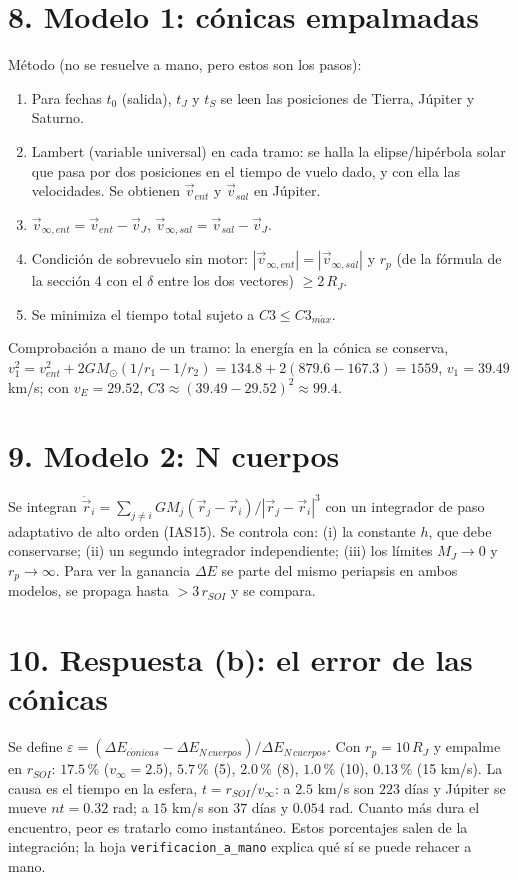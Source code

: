 \documentclass[11pt,letterpaper]{article}
\newcommand{\vinf}{v_\infty}\newcommand{\RJ}{R_J}
\begin{document}
\section*{8. Modelo 1: cónicas empalmadas}
Método (no se resuelve a mano, pero estos son los pasos):
\begin{enumerate}[label=\arabic*.]
\item Para fechas $t_0$ (salida), $t_J$ y $t_S$ se leen las posiciones de Tierra, Júpiter y Saturno.
\item Lambert (variable universal) en cada tramo: se halla la elipse/hipérbola solar que pasa por dos posiciones en el tiempo de vuelo dado, y con ella las velocidades. Se obtienen $\vec v_{ent}$ y $\vec v_{sal}$ en Júpiter.
\item $\vec v_{\infty,ent}=\vec v_{ent}-\vec v_J$, $\vec v_{\infty,sal}=\vec v_{sal}-\vec v_J$.
\item Condición de sobrevuelo sin motor: $|\vec v_{\infty,ent}|=|\vec v_{\infty,sal}|$ y $r_p$ (de la fórmula de la sección 4 con el $\delta$ entre los dos vectores) $\ge2\,\RJ$.
\item Se minimiza el tiempo total sujeto a $C3\le C3_{m\acute{a}x}$.
\end{enumerate}
Comprobación a mano de un tramo: la energía en la cónica se conserva, $v_1^2=v_{ent}^2+2GM_\odot(1/r_1-1/r_2)=134.8+2(879.6-167.3)=1559$, $v_1=39.49$ km/s; con $v_E=29.52$, $C3\approx(39.49-29.52)^2\approx99.4$.

\section*{9. Modelo 2: N cuerpos}
Se integran $\ddot{\vec r}_i=\sum_{j\ne i}GM_j(\vec r_j-\vec r_i)/|\vec r_j-\vec r_i|^3$ con un integrador de paso adaptativo de alto orden (IAS15). Se controla con: (i) la constante $h$, que debe conservarse; (ii) un segundo integrador independiente; (iii) los límites $M_J\to0$ y $r_p\to\infty$. Para ver la ganancia $\Delta E$ se parte del mismo periapsis en ambos modelos, se propaga hasta $>3\,r_{SOI}$ y se compara.

\section*{10. Respuesta (b): el error de las cónicas}
Se define $\varepsilon=(\Delta E_{c\acute{o}nicas}-\Delta E_{N\,cuerpos})/\Delta E_{N\,cuerpos}$. Con $r_p=10\,\RJ$ y empalme en $r_{SOI}$: $17.5\,\%$ ($\vinf=2.5$), $5.7\,\%$ (5), $2.0\,\%$ (8), $1.0\,\%$ (10), $0.13\,\%$ (15 km/s). La causa es el tiempo en la esfera, $t=r_{SOI}/\vinf$: a $2.5$ km/s son $223$ días y Júpiter se mueve $nt=0.32$ rad; a $15$ km/s son $37$ días y $0.054$ rad. Cuanto más dura el encuentro, peor es tratarlo como instantáneo. Estos porcentajes salen de la integración; la hoja \texttt{verificacion\_a\_mano} explica qué sí se puede rehacer a mano.
\end{document}
